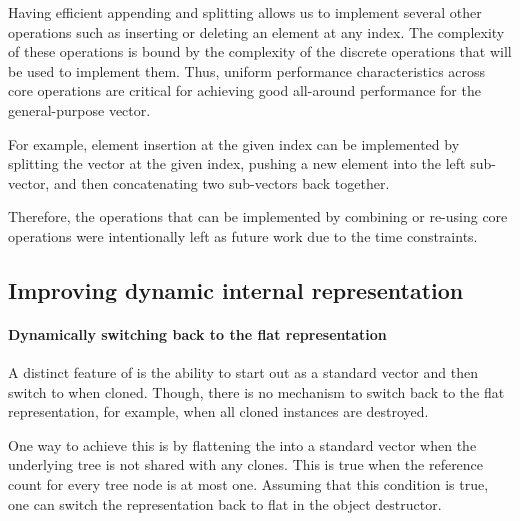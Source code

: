 Having efficient appending and splitting allows us to implement several other operations such as inserting or deleting an element at any index. The complexity of these operations is bound by the complexity of the discrete operations that will be used to implement them. Thus, uniform performance characteristics across core operations are critical for achieving good all-around performance for the general-purpose vector. 

For example, element insertion at the given index can be implemented by splitting the vector at the given index, pushing a new element into the left sub-vector, and then concatenating two sub-vectors back together.

Therefore, the operations that can be implemented by combining or re-using core operations were intentionally left as future work due to the time constraints.

\subsection{Improving dynamic internal representation}

\paragraph*{Dynamically switching back to the flat representation}
A distinct feature of \pvec{} is the ability to start out as a standard vector and then switch to \rrbvec{} when cloned. Though, there is no mechanism to switch back to the flat representation, for example, when all cloned instances are destroyed. 

One way to achieve this is by flattening the \rrbtree{} into a standard vector when the underlying tree is not shared with any clones. This is true when the reference count for every tree node is at most one. Assuming that this condition is true, one can switch the representation back to flat in the object destructor. 


